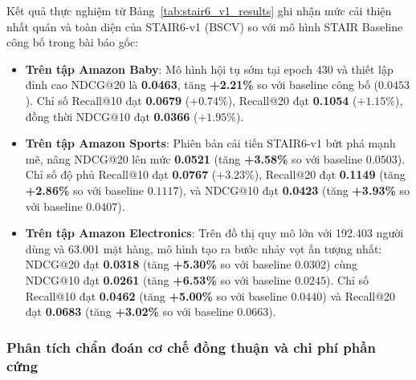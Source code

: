 Kết quả thực nghiệm từ Bảng~\ref{tab:stair6_v1_results} ghi nhận mức cải thiện nhất quán và toàn diện của STAIR6-v1 (BSCV) so với mô hình STAIR Baseline công bố trong bài báo gốc:
\begin{itemize}
    \item \textbf{Trên tập Amazon Baby}: Mô hình hội tụ sớm tại epoch 430 và thiết lập đỉnh cao NDCG@20 là \textbf{0.0463}, tăng \textbf{+2.21\%} so với baseline công bố ($0.0453$). Chỉ số Recall@10 đạt \textbf{0.0679} ($+0.74\%$), Recall@20 đạt \textbf{0.1054} ($+1.15\%$), đồng thời NDCG@10 đạt \textbf{0.0366} ($+1.95\%$).
    \item \textbf{Trên tập Amazon Sports}: Phiên bản cải tiến STAIR6-v1 bứt phá mạnh mẽ, nâng NDCG@20 lên mức \textbf{0.0521} (tăng \textbf{+3.58\%} so với baseline $0.0503$). Chỉ số độ phủ Recall@10 đạt \textbf{0.0767} ($+3.23\%$), Recall@20 đạt \textbf{0.1149} (tăng \textbf{+2.86\%} so với baseline $0.1117$), và NDCG@10 đạt \textbf{0.0423} (tăng \textbf{+3.93\%} so với baseline $0.0407$).
    \item \textbf{Trên tập Amazon Electronics}: Trên đồ thị quy mô lớn với 192.403 người dùng và 63.001 mặt hàng, mô hình tạo ra bước nhảy vọt ấn tượng nhất: NDCG@20 đạt \textbf{0.0318} (tăng \textbf{+5.30\%} so với baseline $0.0302$) cùng NDCG@10 đạt \textbf{0.0261} (tăng \textbf{+6.53\%} so với baseline $0.0245$). Chỉ số Recall@10 đạt \textbf{0.0462} (tăng \textbf{+5.00\%} so với baseline $0.0440$) và Recall@20 đạt \textbf{0.0683} (tăng \textbf{+3.02\%} so với baseline $0.0663$).
\end{itemize}

\subsubsection{Phân tích chẩn đoán cơ chế đồng thuận và chi phí phần cứng}

